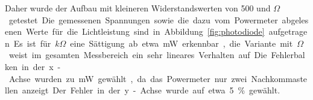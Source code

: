 Daher wurde der Aufbau mit kleineren Widerstandswerten von 500 und \unit[1000]{$\Omega$} getestet. Die gemessenen Spannungen sowie die dazu vom Powermeter abgelesenen Werte für die Lichtleistung sind in Abbildung~\ref{fig:photodiode} aufgetragen.

Es ist für \unit[1]{$k\Omega$} eine Sättigung ab etwa \unit[0,9]{mW} erkennbar, die Variante mit \unit[500]{$\Omega$} weist im gesamten Messbereich ein sehr lineares Verhalten auf. Die Fehlerbalken in der x-Achse wurden zu \unit[0,01]{mW} gewählt, da das Powermeter nur zwei Nachkommastellen anzeigt. Der Fehler in der y-Achse wurde auf etwa 5\% gewählt.

